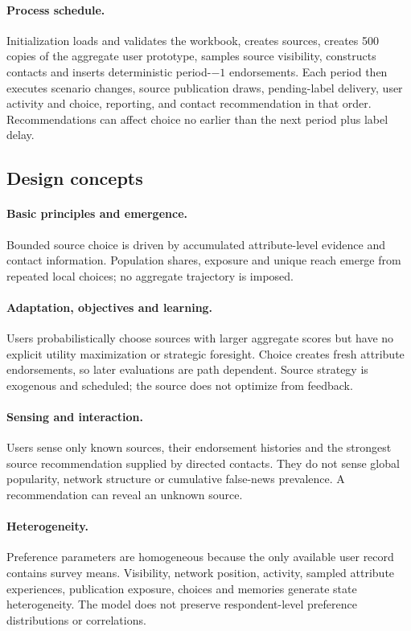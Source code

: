 \paragraph{Process schedule.} Initialization loads and validates the workbook, creates sources, creates 500 copies of the aggregate user prototype, samples source visibility, constructs contacts and inserts deterministic period-$-1$ endorsements. Each period then executes scenario changes, source publication draws, pending-label delivery, user activity and choice, reporting, and contact recommendation in that order. Recommendations can affect choice no earlier than the next period plus label delay.

\subsection{Design concepts}

\paragraph{Basic principles and emergence.} Bounded source choice is driven by accumulated attribute-level evidence and contact information. Population shares, exposure and unique reach emerge from repeated local choices; no aggregate trajectory is imposed.

\paragraph{Adaptation, objectives and learning.} Users probabilistically choose sources with larger aggregate scores but have no explicit utility maximization or strategic foresight. Choice creates fresh attribute endorsements, so later evaluations are path dependent. Source strategy is exogenous and scheduled; the source does not optimize from feedback.

\paragraph{Sensing and interaction.} Users sense only known sources, their endorsement histories and the strongest source recommendation supplied by directed contacts. They do not sense global popularity, network structure or cumulative false-news prevalence. A recommendation can reveal an unknown source.

\paragraph{Heterogeneity.} Preference parameters are homogeneous because the only available user record contains survey means. Visibility, network position, activity, sampled attribute experiences, publication exposure, choices and memories generate state heterogeneity. The model does not preserve respondent-level preference distributions or correlations.

